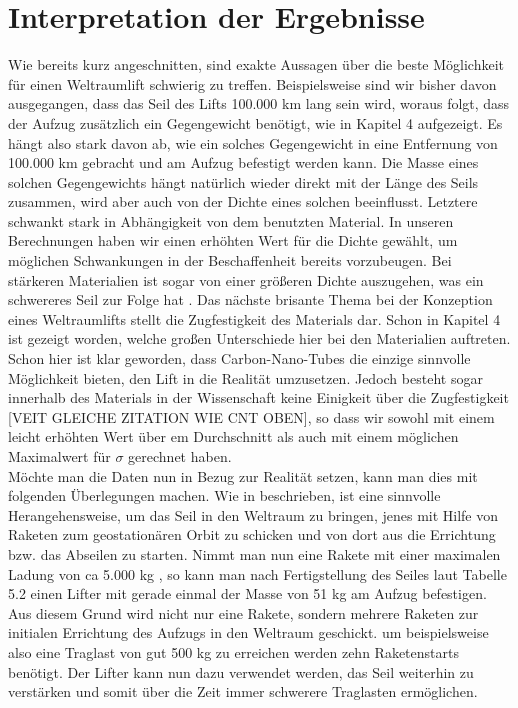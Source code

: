 \documentclass[a4paper, 10pt]{report}
\begin{document}
\section{Interpretation der Ergebnisse}
Wie bereits kurz angeschnitten, sind exakte Aussagen über die beste Möglichkeit für einen Weltraumlift schwierig zu treffen. Beispielsweise sind wir bisher davon ausgegangen, dass das Seil des Lifts 100.000 km lang sein wird, woraus folgt, dass der Aufzug zusätzlich ein Gegengewicht benötigt, wie in Kapitel 4 aufgezeigt. Es hängt also stark davon ab, wie ein solches Gegengewicht in eine Entfernung von 100.000 km gebracht und am Aufzug befestigt werden kann. Die Masse eines solchen Gegengewichts hängt natürlich wieder direkt mit der Länge des Seils zusammen, wird aber auch von der Dichte eines solchen beeinflusst. Letztere schwankt stark in Abhängigkeit von dem benutzten Material. In unseren Berechnungen haben wir einen erhöhten Wert für die Dichte gewählt, um möglichen Schwankungen in der Beschaffenheit bereits vorzubeugen. Bei stärkeren Materialien ist sogar von einer größeren Dichte auszugehen, was ein schwereres Seil zur Folge hat \cite{DMOS}. Das nächste brisante Thema bei der Konzeption eines Weltraumlifts stellt die Zugfestigkeit des Materials dar. Schon in Kapitel 4 ist gezeigt worden, welche großen Unterschiede hier bei den Materialien auftreten. Schon hier ist klar geworden, dass Carbon-Nano-Tubes die einzige sinnvolle Möglichkeit bieten, den Lift in die Realität umzusetzen. Jedoch besteht sogar innerhalb des Materials in der Wissenschaft keine Einigkeit über die Zugfestigkeit [VEIT GLEICHE ZITATION WIE CNT OBEN], so dass wir sowohl mit einem leicht erhöhten Wert über em Durchschnitt als auch mit einem möglichen Maximalwert für \( \sigma \) gerechnet haben.\\
Möchte man die Daten nun in Bezug zur Realität setzen, kann man dies mit folgenden Überlegungen machen. Wie in \cite{ED00} beschrieben, ist eine sinnvolle Herangehensweise, um das Seil in den Weltraum zu bringen, jenes mit Hilfe von Raketen zum geostationären Orbit zu schicken und von dort aus die Errichtung bzw. das Abseilen zu starten. Nimmt man nun eine Rakete mit einer maximalen Ladung von ca 5.000 kg \cite{ED00}, so kann man nach Fertigstellung des Seiles laut Tabelle 5.2 einen Lifter mit gerade einmal der Masse von 51 kg am Aufzug befestigen. Aus diesem Grund wird nicht nur eine Rakete, sondern mehrere Raketen zur initialen Errichtung des Aufzugs in den Weltraum geschickt. um beispielsweise also eine Traglast von gut 500 kg zu erreichen werden zehn Raketenstarts benötigt. Der Lifter kann nun dazu verwendet werden, das Seil weiterhin zu verstärken und somit über die Zeit immer schwerere Traglasten ermöglichen\cite{ED00}. 
\end{document}
